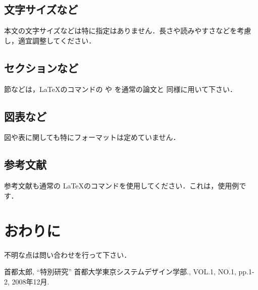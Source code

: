 \documentclass{jarticle}
\begin{document}
\subsection{文字サイズなど}
本文の文字サイズなどは特に指定はありません．長さや読みやすさなどを考慮し，適宜調整してください．
\subsection{セクションなど}
節などは，\LaTeX のコマンドの  や  を通常の論文と
同様に用いて下さい．

\subsection{図表など}
図や表に関しても特にフォーマットは定めていません．

\subsection{参考文献}
参考文献も通常の \LaTeX のコマンドを使用してください．これは，使用例です\cite{tarou1}．
\section{おわりに}
不明な点は問い合わせを行って下さい．


\begin{thebibliography}{9}\footnotesize
{} 首都太郎, ``特別研究'' 首都大学東京システムデザイン学部., VOL.1, NO.1,
	 pp.1-2, 2008年12月.

\end{thebibliography}
%
\end{document}
